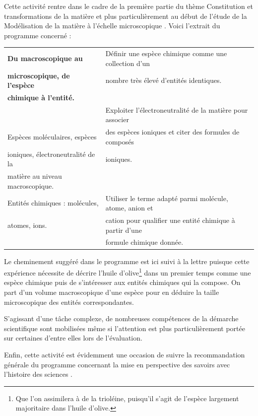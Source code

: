 \documentclass[12pt,a4paper]{article}
\begin{document}
Cette activité rentre dans le cadre de la première partie du thème \og Constitution et transformations de la matière \fg{} et plus particulièrement au début de l'étude de la \og Modélisation de la matière à l'échelle microscopique \fg{}.
Voici l'extrait du programme concerné :
\begin{center}
\begin{tabular}{|l|l|}
\hline
\textbf{Du macroscopique au} 			& Définir une espèce chimique comme une collection d'un \\
\textbf{microscopique, de l'espèce}	& nombre très élevé d'entités identiques. \\
\textbf{chimique à l'entité.}					& \\
																& Exploiter l'électroneutralité de la matière pour associer\\
Espèces moléculaires, espèces		& des espèces ioniques et citer des formules de composés\\
ioniques, électroneutralité de la			& ioniques.\\
matière au niveau	 macroscopique.	& \\
\hline
Entités chimiques : molécules,			& Utiliser le terme adapté parmi molécule, atome, anion et \\
atomes, ions.											& cation pour qualifier une entité chimique à partir d'une \\
																& formule chimique donnée. \\
\hline
\end{tabular}
\end{center}
Le cheminement suggéré dans le programme est ici suivi à la lettre puisque cette expérience nécessite de décrire l'huile d'olive\footnote{Que l'on assimilera à de la trioléine, puisqu'il s'agit de l'espèce largement majoritaire dans l'huile d'olive.} dans un premier temps comme une espèce chimique puis de s'intéresser aux entités chimiques qui la compose.
On part d'un volume macroscopique d'une espèce pour en déduire la taille microscopique des entités correspondantes.

S'agissant d'une tâche complexe, de nombreuses compétences de la démarche scientifique sont mobilisées même si l'attention est plus particulièrement portée sur certaines d'entre elles lors de l'évaluation.

Enfin, cette activité est évidemment une occasion de suivre la recommandation générale du programme concernant la \og mise en perspective des savoirs avec l'histoire des sciences \fg{}.
\end{document}
